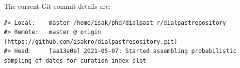 \documentclass[
]{article}
\begin{document}
The current Git commit details are:

\begin{verbatim}
#> Local:    master /home/isak/phd/dialpast_r/dialpastrepository
#> Remote:   master @ origin (https://github.com/isakro/dialpastrepository.git)
#> Head:     [aa13e0e] 2021-05-07: Started assembling probabilistic sampling of dates for curation index plot
\end{verbatim}
\end{document}

